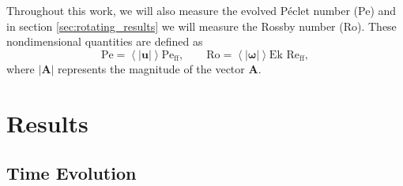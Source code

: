 \documentclass[aps, pre, onecolumn, nofootinbib, notitlepage, groupedaddress, amsfonts, amssymb, amsmath, longbibliography, superscriptaddress]{revtex4-1}
\newcommand{\angles}[1]{\ensuremath{\left\langle #1 \right\rangle}}
\newcommand{\Reff}{\ensuremath{\text{Re}_{\text{ff}}}}
\newcommand{\Peff}{\ensuremath{\text{Pe}_{\text{ff}}}}
\begin{document}
Throughout this work, we will also measure the evolved P\'{e}clet number (Pe) and in section \ref{sec:rotating_results} we will measure the Rossby number (Ro).
These nondimensional quantities are defined as
\begin{equation}
\text{Pe} = \angles{|\bm{u}|}\Peff,\qquad \text{Ro} = \angles{|\bm{\omega}|}\text{Ek }\Reff,
\end{equation}
where $|\bm{A}|$ represents the magnitude of the vector $\bm{A}$.





\section{Results}
\label{sec:2d_results}

\subsection{Time Evolution}
\end{document}
